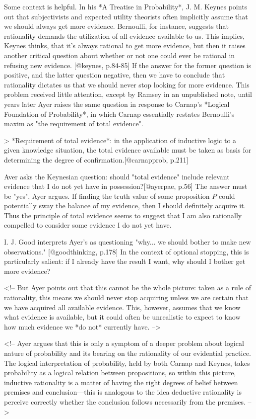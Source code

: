 Some context is helpful. In his *A Treatise in Probability*, J. M.
Keynes points out that subjectivists and expected utility theorists
often implicitly assume that we should always get more evidence.
Bernoulli, for instance, suggests that rationality demands the
utilization of all evidence available to us. This implies, Keynes
thinks, that it's always rational to get more evidence, but then it
raises another critical question about whether or not one could ever be
rational in refusing new evidence. {[}@keynes, p.84-85{]} If the answer
for the former question is positive, and the latter question negative,
then we have to conclude that rationality dictates us that we should
never stop looking for more evidence. This problem received little
attention, except by Ramsey in an unpublished note, until years later
Ayer raises the same question in response to Carnap's *Logical
Foundation of Probability*, in which Carnap essentially restates
Bernoulli's maxim as "the requirement of total evidence".

\textgreater{} *Requirement of total evidence*: in the application of
inductive logic to a given knowledge situation, the total evidence
available must be taken as basis for determining the degree of
confirmation.{[}@carnapprob, p.211{]}

Aver asks the Keynesian question: should "total evidence" include
relevant evidence that I do not yet have in possession?{[}@ayerpae,
p.56{]} The answer must be "yes", Ayer argues. If finding the truth
value of some proposition \(P\) could potentially sway the balance of my
evidence, then I should definitely acquire it. Thus the principle of
total evidence seems to suggest that I am also rationally compelled to
consider some evidence I do not yet have.

I. J. Good interprets Ayer's as questioning "why... we should bother to
make new observations." {[}@goodthinking, p.178{]} In the context of
optional stopping, this is particularly salient: if I already have the
result I want, why should I bother get more evidence?

\textless{}!-- But Ayer points out that this cannot be the whole
picture: taken as a rule of rationality, this means we should never stop
acquiring unless we are certain that we have acquired all available
evidence. This, however, assumes that we know what evidence is
available, but it could often be unrealistic to expect to know how much
evidence we *do not* currently have. --\textgreater{}

\textless{}!-- Ayer argues that this is only a symptom of a deeper
problem about logical nature of probability and its bearing on the
rationality of our evidential practice. The logical interpretation of
probability, held by both Carnap and Keynes, takes probability as a
logical relation between propositions, so within this picture, inductive
rationality is a matter of having the right degrees of belief between
premises and conclusion---this is analogous to the idea deductive
rationality is perceive correctly whether the conclusion follows
necessarily from the premises. --\textgreater{}

